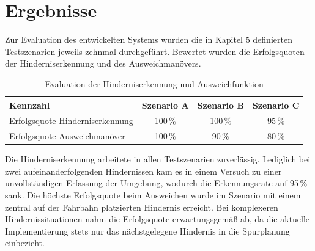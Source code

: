 \section{Ergebnisse}
\label{sec:ergebnisse}
Zur Evaluation des entwickelten Systems wurden die in Kapitel 5 definierten Testszenarien jeweils zehnmal durchgeführt. Bewertet wurden die Erfolgsquoten der Hinderniserkennung und des Ausweichmanövers.

\begin{table}[h!]
    \centering
    \small
    \begin{tabular}{lccc}
        \toprule
        \textbf{Kennzahl}               & \textbf{Szenario A} & \textbf{Szenario B} & \textbf{Szenario C} \\
        \midrule
        Erfolgsquote Hinderniserkennung & 100\,\%             & 100\,\%             & 95\,\%              \\
        Erfolgsquote Ausweichmanöver    & 100\,\%             & 90\,\%              & 80\,\%              \\
        \bottomrule
    \end{tabular}
    \caption{Evaluation der Hinderniserkennung und Ausweichfunktion}
    \label{tab:evaluation}
\end{table}

Die Hinderniserkennung arbeitete in allen Testszenarien zuverlässig. Lediglich bei zwei aufeinanderfolgenden Hindernissen kam es in einem Versuch zu einer unvollständigen Erfassung der Umgebung, wodurch die Erkennungsrate auf 95\,\% sank. Die höchste Erfolgsquote beim Ausweichen wurde im Szenario mit einem zentral auf der Fahrbahn platzierten Hindernis erreicht. Bei komplexeren Hindernissituationen nahm die Erfolgsquote erwartungsgemäß ab, da die aktuelle Implementierung stets nur das nächstgelegene Hindernis in die Spurplanung einbezieht.
